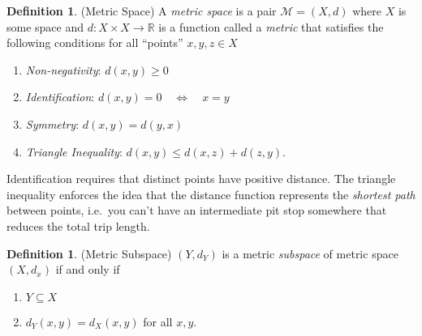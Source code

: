\documentclass[12pt]{article}
\numberwithin{equation}{section} %
\theoremstyle{plain}
\theoremstyle{definition}
\newtheorem{defn}[thm]{Definition}
\theoremstyle{remark}
\newcommand{\R}{\mathbb{R}}
\begin{document}
\begin{defn}{(Metric Space)}
\label{defn:metric}
A \emph{metric space} is a pair $\mathscr{M}=(X,d)$ where $X$ is some
space and $d:X\times X\rightarrow \R$ is a function
called a \emph{metric} that satisfies the following conditions for all
``points'' $x,y,z\in X$
\begin{enumerate}
  \item \emph{Non-negativity}: $d(x,y)\geq 0$
  \item \emph{Identification}: $d(x,y) = 0 \quad \Leftrightarrow \quad x=y$
  \item \emph{Symmetry}: $d(x,y)=d(y,x)$
  \item \emph{Triangle Inequality}: $d(x,y) \leq d(x,z) + d(z,y)$.
\end{enumerate}
Identification requires that distinct points have positive distance.
The triangle inequality enforces the idea that the distance function
represents the \emph{shortest path} between points, i.e.\ you can't have
an intermediate pit stop somewhere that reduces the total trip length.
\end{defn}

\begin{defn}{(Metric Subspace)}
$(Y,d_Y)$ is a metric \emph{subspace} of metric space $(X,d_x)$ if and
only if
\begin{enumerate}
  \item $Y\subseteq X$
  \item $d_Y(x,y) = d_X(x,y)$ for all $x,y$.
\end{enumerate}
\end{defn}
\end{document}
